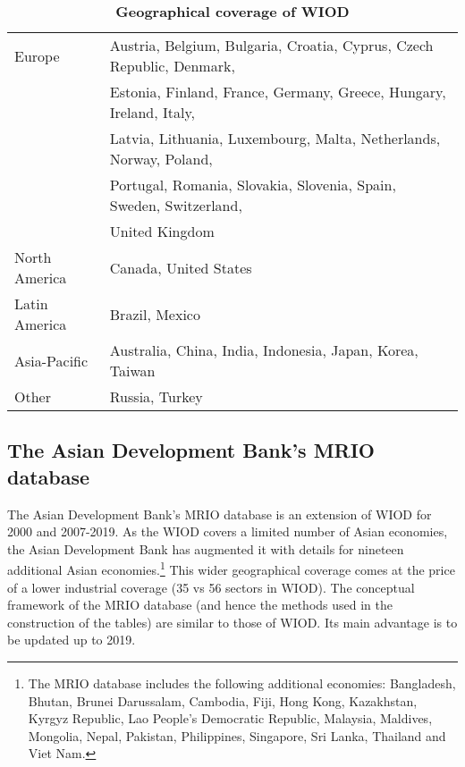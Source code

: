 \documentclass[11pt,a4paper]{paper} %
\begin{document}
 
\begin{table}[!h]
\begin{threeparttable}
\centering
\centering
\caption{\small{\textbf{Geographical coverage of WIOD}}}
\small
\begin{tabular}{ll}
\hline\hline
Europe & Austria, Belgium, Bulgaria, Croatia, Cyprus, Czech Republic, Denmark,\\
& Estonia, Finland, France, Germany, Greece, Hungary, Ireland, Italy,\\
& Latvia, Lithuania, Luxembourg, Malta, Netherlands, Norway, Poland,\\
&Portugal, Romania, Slovakia, Slovenia, Spain, Sweden, Switzerland,\\
& United Kingdom\\
North  America& Canada, United States\\
Latin America & Brazil, Mexico \\
Asia-Pacific & Australia, China, India, Indonesia, Japan, Korea, Taiwan\\
Other & Russia, Turkey\\
\hline\hline
\end{tabular} 
\label{tab:wiod}
\end{threeparttable}
\end{table} 

\subsection{The Asian Development Bank's MRIO database} 
The Asian Development Bank's MRIO database is an extension of WIOD for 2000 and 2007-2019.
As the WIOD covers a limited number of Asian economies, the Asian Development Bank has augmented it with details for nineteen additional Asian economies.\footnote{The MRIO database includes the following additional economies: Bangladesh, Bhutan, Brunei Darussalam, Cambodia, Fiji, Hong Kong, Kazakhstan, Kyrgyz Republic, Lao People’s Democratic Republic, Malaysia, Maldives, Mongolia, Nepal, Pakistan, Philippines, Singapore, Sri Lanka, Thailand and Viet Nam.}
This wider geographical coverage comes at the price of a lower industrial coverage (35 vs 56 sectors in WIOD).
The conceptual framework of the MRIO database (and hence the methods used in the construction of the tables) are similar to those of WIOD.
Its main advantage is to be updated up to 2019.  
\end{document}
